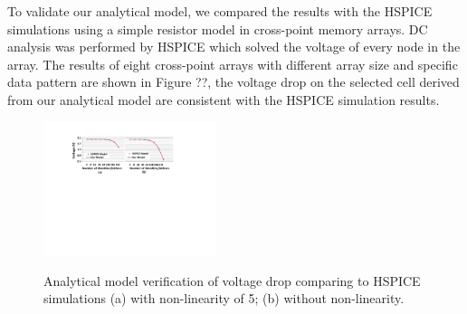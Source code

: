 To validate our analytical model, we compared the results with the HSPICE
simulations using a simple resistor model in cross-point memory arrays. DC
analysis was performed by HSPICE which solved the voltage of every node in
the array. The results of eight cross-point arrays with different array
size and specific data pattern are shown in Figure ??, the voltage drop on
the selected cell derived from our analytical model are consistent with the
HSPICE simulation results.
\begin{figure}%
\centering\label{fig:SPICE}
  \includegraphics[width=0.45\textwidth]{./figures/SPICE.pdf}\\
  \caption{Analytical model verification of voltage drop comparing to HSPICE simulations (a) with non-linearity of 5; (b) without non-linearity.}\label{fig:reliable_region}
    \vspace{-10pt}
\end{figure}
%
